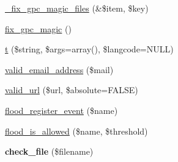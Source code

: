 \begin{CompactItemize}
\item 
\hyperlink{common_8inc_ca820a7438df9d2244148e4b8895291e}{\_\-fix\_\-gpc\_\-magic\_\-files} (\&\$item, \$key)
\item 
\hyperlink{common_8inc_befb935bf3c61840ba9ad50adb13f766}{fix\_\-gpc\_\-magic} ()
\item 
\hyperlink{common_8inc_41d20f0c822bf1f3c26a97981c762665}{t} (\$string, \$args=array(), \$langcode=NULL)
\item 
\hyperlink{group__validation_g486c51f034746a76618602e1e76fa718}{valid\_\-email\_\-address} (\$mail)
\item 
\hyperlink{group__validation_ge9221d1759a8d5a2ba2db93ae3a6feff}{valid\_\-url} (\$url, \$absolute=FALSE)
\item 
\hyperlink{common_8inc_368d89f553ff8bed006c18f801020778}{flood\_\-register\_\-event} (\$name)
\item 
\hyperlink{common_8inc_d2296ecb4750af9f666f72ec7ee3cae5}{flood\_\-is\_\-allowed} (\$name, \$threshold)
\item 
\hypertarget{common_8inc_28eab4ed3df6e6e3ae965f50ccac9227}{
\textbf{check\_\-file} (\$filename)}
\label{common_8inc_28eab4ed3df6e6e3ae965f50ccac9227}


\end{CompactItemize}

